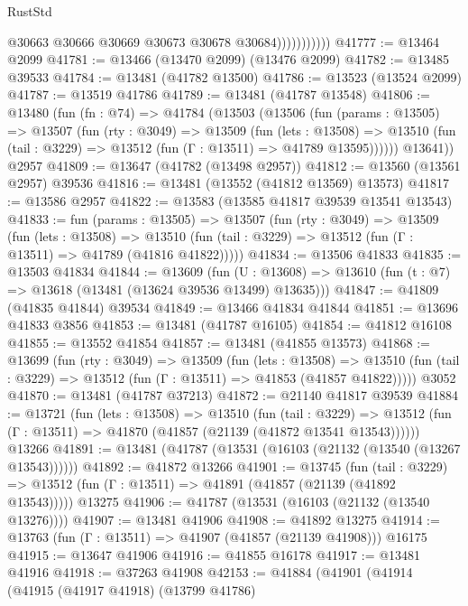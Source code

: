 \begin{lexlean}{RustStd}
\begin{coremodule}
                          @30663
                          @30666
                          @30669
                          @30673
                          @30678
                          @30684)))))))))))
@41777 := @13464 @2099
@41781 := @13466 (@13470 @2099) (@13476 @2099)
@41782 := @13485 @39533
@41784 := @13481 (@41782 @13500)
@41786 := @13523 (@13524 @2099)
@41787 := @13519 @41786
@41789 := @13481 (@41787 @13548)
@41806 := @13480
    (fun (fn : @74) =>
    @41784
      (@13503
        (@13506
          (fun (params : @13505) =>
          @13507
            (fun (rty : @3049) =>
            @13509
              (fun (lets : @13508) =>
              @13510 (fun (tail : @3229) => @13512 (fun (Γ : @13511) => @41789 @13595))))))
        @13641))
    @2957
@41809 := @13647 (@41782 (@13498 @2957))
@41812 := @13560 (@13561 @2957) @39536
@41816 := @13481 (@13552 (@41812 @13569) @13573)
@41817 := @13586 @2957
@41822 := @13583 (@13585 @41817 @39539 @13541 @13543)
@41833 := fun (params : @13505) =>
  @13507
    (fun (rty : @3049) =>
    @13509
      (fun (lets : @13508) =>
      @13510 (fun (tail : @3229) => @13512 (fun (Γ : @13511) => @41789 (@41816 @41822)))))
@41834 := @13506 @41833
@41835 := @13503 @41834
@41844 := @13609
    (fun (U : @13608) => @13610 (fun (t : @7) => @13618 (@13481 (@13624 @39536 @13499) @13635)))
@41847 := @41809 (@41835 @41844) @39534
@41849 := @13466 @41834 @41844
@41851 := @13696 @41833 @3856
@41853 := @13481 (@41787 @16105)
@41854 := @41812 @16108
@41855 := @13552 @41854
@41857 := @13481 (@41855 @13573)
@41868 := @13699
    (fun (rty : @3049) =>
    @13509
      (fun (lets : @13508) =>
      @13510 (fun (tail : @3229) => @13512 (fun (Γ : @13511) => @41853 (@41857 @41822)))))
    @3052
@41870 := @13481 (@41787 @37213)
@41872 := @21140 @41817 @39539
@41884 := @13721
    (fun (lets : @13508) =>
    @13510
      (fun (tail : @3229) =>
      @13512 (fun (Γ : @13511) => @41870 (@41857 (@21139 (@41872 @13541 @13543))))))
    @13266
@41891 := @13481 (@41787 (@13531 (@16103 (@21132 (@13540 (@13267 @13543))))))
@41892 := @41872 @13266
@41901 := @13745
    (fun (tail : @3229) => @13512 (fun (Γ : @13511) => @41891 (@41857 (@21139 (@41892 @13543)))))
    @13275
@41906 := @41787 (@13531 (@16103 (@21132 (@13540 @13276))))
@41907 := @13481 @41906
@41908 := @41892 @13275
@41914 := @13763 (fun (Γ : @13511) => @41907 (@41857 (@21139 @41908))) @16175
@41915 := @13647 @41906
@41916 := @41855 @16178
@41917 := @13481 @41916
@41918 := @37263 @41908
@42153 := @41884
    (@41901
      (@41914
        (@41915
          (@41917 @41918)
          (@13799 @41786)

\end{coremodule}
\end{lexlean}
